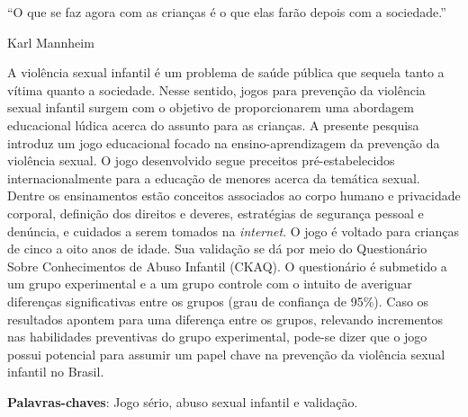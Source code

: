 \begin{epigrafe}	
``O que se faz agora com as crianças é o que elas farão depois com a sociedade.''
\\
\par
Karl Mannheim
\end{epigrafe}


\begin{resumo}

A violência sexual infantil é um problema de saúde pública que sequela tanto a vítima quanto a sociedade. Nesse sentido, jogos para prevenção da violência sexual infantil surgem com o objetivo de proporcionarem uma abordagem educacional lúdica acerca do assunto para as crianças. A presente pesquisa introduz um jogo educacional focado na ensino-aprendizagem da prevenção da violência sexual. O jogo desenvolvido segue preceitos pré-estabelecidos internacionalmente para a educação de menores acerca da temática sexual. Dentre os ensinamentos estão conceitos associados ao corpo humano e privacidade corporal, definição dos direitos e deveres, estratégias de segurança pessoal e denúncia, e cuidados a serem tomados na \textit{internet}. O jogo é voltado para crianças de cinco a oito anos de idade. Sua validação se dá por meio do Questionário Sobre Conhecimentos de Abuso Infantil (CKAQ). O questionário é submetido a um grupo experimental e a um grupo controle com o intuito de averiguar diferenças significativas entre os grupos (grau de confiança de 95\%). Caso os resultados apontem para uma diferença entre os grupos, relevando incrementos nas habilidades preventivas do grupo experimental, pode-se dizer que o jogo possui potencial para assumir um papel chave na prevenção da violência sexual infantil no Brasil.

 \vspace{\onelineskip}
    
 \noindent
 \textbf{Palavras-chaves}: Jogo sério, abuso sexual infantil e validação.
\end{resumo}

